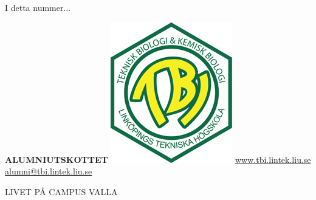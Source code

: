 \documentclass[10pt,final,hyphenatedtitles]{papertex}
\renewcommand{\todo}[1]{}
\begin{document}
\begin{frontpage}

\begin{indexblock}{I detta nummer...}






\end{indexblock}


\todo{ta bort, sätt in logo, hemsida, kontaktuppgifter}
\begin{authorblock}
\textbf{ALUMNIUTSKOTTET}
\includegraphics{img/tbi.jpg}
\url{www.tbi.lintek.liu.se}
\href{mailto:alumni@tbi.lintek.liu.se}{alumni@tbi.lintek.liu.se}
\end{authorblock}



\begin{weatherblock}{LIVET PÅ CAMPUS VALLA}

\end{weatherblock}

\end{frontpage}


\end{document}
